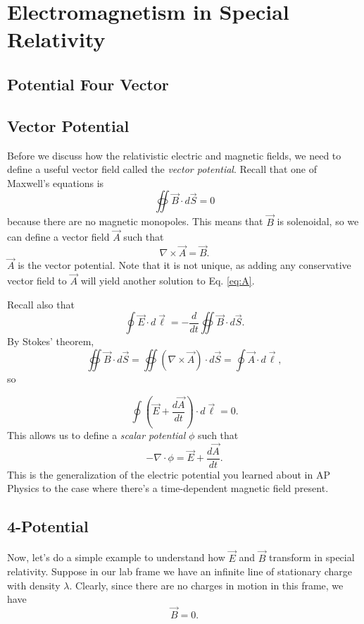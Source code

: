 \section{Electromagnetism in Special Relativity}
\subsection{Potential Four Vector}
\subsection*{Vector Potential}
Before we discuss how the relativistic electric and magnetic fields, we need to define a useful vector field called the \textit{vector potential}. Recall that one of Maxwell's equations is \begin {equation} \oiint \vec{B} \cdot d\vec{S} = 0 \label{eq:nomagmon} \end{equation} because there are no magnetic monopoles. This means that $\vec{B}$ is solenoidal, so we can define a vector field $\vec{A}$ such that  \begin{equation} \nabla\times\vec{A} = \vec{B}. \label {eq:A} \end{equation} $\vec{A}$ is the vector potential. Note that it is not unique, as adding any conservative vector field to $\vec{A}$ will yield another solution to Eq. \ref{eq:A}.

Recall also that 
\begin{equation} \oint \vec{E} \cdot d\vec{\ell} = - \frac{d}{dt} \oiint \vec{B} \cdot d\vec{S}. \label{eq:faraday-lenz} \end{equation}
By Stokes' theorem,
$$\oiint \vec{B} \cdot d\vec{S} = \oiint (\nabla \times \vec{A}) \cdot d\vec{S} = \oint \vec{A} \cdot d\vec{\ell},$$ so 

$$\oint \left(\vec{E} +\frac{d \vec{A}}{dt}\right) \cdot d \vec{\ell} = 0.$$ This allows us to define a \textit{scalar potential} $\phi$ such that 
\begin{equation}-\nabla \cdot \phi = \vec{E} +\frac{d \vec{A}}{dt}.\label{eq:scalpot}\end{equation} This is the generalization of the electric potential you learned about in AP Physics to the case where there's a time-dependent magnetic field present.
\subsection*{4-Potential}
Now, let's do a simple example to understand how $\vec{E}$ and $\vec{B}$ transform in special relativity. Suppose in our lab frame we have an infinite line of stationary charge with density $\lambda$. Clearly, since there are no charges in motion in this frame, we have 
\begin{equation}\vec{B} = 0 \label{eq:Blab}.\end{equation}

